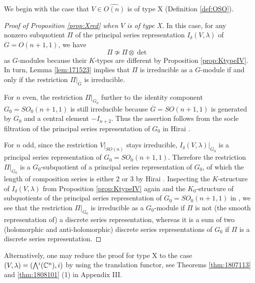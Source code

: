 We begin with the case 
 that $V \in \widehat{O(n)}$ is of type X
 (Definition \ref{def:OSO}).  

\begin{proof}[Proof of Proposition \ref{prop:Xred} when $V$ is of type X]
In this case,
 for any nonzero subquotient $\Pi$ 
 of the principal series representation $I_{\delta}(V,\lambda)$ of $G=O(n+1,1)$, 
 we have 
\[\Pi \not \simeq \Pi \otimes \det\]
as $G$-modules
 because their $K$-types are different
 by Proposition \ref{prop:KtypeIV}.  
In turn, 
 Lemma \ref{lem:171523} implies
 that $\Pi$ is irreducible as a $G$-module
 if and only if the restriction $\Pi|_{\overline G}$
 is irreducible.  



For $n$ even, 
 the restriction $\Pi|_{G_0}$
 further to the identity component $G_0=SO_0(n+1,1)$ 
 is still irreducible
 because $\overline G=SO(n+1,1)$ is generated
 by $G_0$ 
 and a central element $-I_{n+2}$.  
Thus the assertion follows from the socle filtration
 of the principal series representation of $G_0$
 in Hirai \cite{Hirai62}.  


For $n$ odd, 
 since the restriction $V|_{SO(n)}$ stays irreducible, 
 $I_{\delta}(V,\lambda)|_{G_0}$ is a principal series representation 
 of $G_0=SO_0(n+1,1)$.  
Therefore the restriction $\Pi|_{G_0}$ is a $G_0$-subquotient
 of a principal series representation
 of $G_0$, 
 of which the length of composition series is either 2 or 3
 by Hirai \cite{Hirai62}.  
Inspecting the $K$-structure of $I_{\delta}(V,\lambda)$ from 
 Proposition \ref{prop:KtypeIV} again 
 and the $K_0$-structure of subquotients
 of the principal series representation 
 of 
$G_0=SO_0(n+1,1)$ in \cite{Hirai62}, 
 we see that the restriction $\Pi|_{G_0}$ is irreducible
 as a $G_0$-module
 if $\Pi$ is not (the smooth representation of)
 a discrete series representation, 
 whereas it is a sum 
 of two (holomorphic and anti-holomorphic) discrete series representations 
 of $G_0$
 if $\Pi$ is a discrete series representation.  
\end{proof}



Alternatively,
 one may reduce the proof for type X
 to the case $(V,\lambda)=(\Exterior^i({\mathbb{C}}^n), i)$
 by using the translation functor, 
 see Theorems \ref{thm:1807113} and \ref{thm:1808101} (1)
 in Appendix III.  



